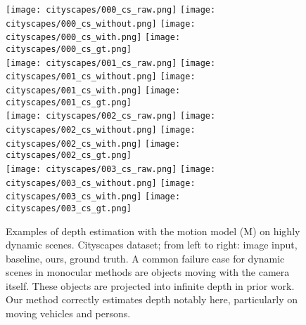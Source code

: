 \documentclass[10pt,twocolumn,letterpaper]{article}
\begin{document}
\begin{figure*}
\begin{center}
  \texttt{[image: cityscapes/000\_cs\_raw.png]}
  \texttt{[image: cityscapes/000\_cs\_without.png]}
  \texttt{[image: cityscapes/000\_cs\_with.png]}
  \texttt{[image: cityscapes/000\_cs\_gt.png]}\\
  
  \texttt{[image: cityscapes/001\_cs\_raw.png]}
  \texttt{[image: cityscapes/001\_cs\_without.png]}
  \texttt{[image: cityscapes/001\_cs\_with.png]}
  \texttt{[image: cityscapes/001\_cs\_gt.png]}\\
  
  \texttt{[image: cityscapes/002\_cs\_raw.png]}
  \texttt{[image: cityscapes/002\_cs\_without.png]}
  \texttt{[image: cityscapes/002\_cs\_with.png]}
  \texttt{[image: cityscapes/002\_cs\_gt.png]}\\
  
  \texttt{[image: cityscapes/003\_cs\_raw.png]}
  \texttt{[image: cityscapes/003\_cs\_without.png]}
  \texttt{[image: cityscapes/003\_cs\_with.png]}
  \texttt{[image: cityscapes/003\_cs\_gt.png]}\\

\end{center}
\vspace{-4pt}
  \caption{Examples of depth estimation with the motion model (M) on highly dynamic scenes. City\-scapes dataset; from left to right: image input, baseline, ours, ground truth. A common failure case for dynamic scenes in monocular methods are objects moving with the camera itself. These objects are projected into infinite depth in prior work. Our method correctly estimates depth notably here, particularly on moving vehicles and persons.
  }
\label{fig:main_city}
\vspace{-4pt}
\end{figure*}
\end{document}

